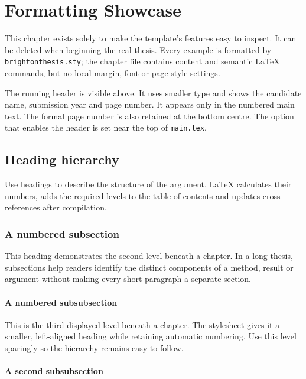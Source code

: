 \chapter{Formatting Showcase}
\label{chap:formatting-showcase}

This chapter exists solely to make the template's features easy to inspect.
It can be deleted when beginning the real thesis. Every example is formatted
by \texttt{brightonthesis.sty}; the chapter file contains content and semantic
LaTeX commands, but no local margin, font or page-style settings.

The running header is visible above. It uses smaller type and shows the
candidate name, submission year and page number. It appears only in the
numbered main text. The formal page number is also retained at the bottom
centre. The option that enables the header is set near the top of
\texttt{main.tex}.

\section{Heading hierarchy}
\label{sec:showcase-headings}

Use headings to describe the structure of the argument. LaTeX calculates their
numbers, adds the required levels to the table of contents and updates
cross-references after compilation.

\subsection{A numbered subsection}
\label{sec:showcase-subsection}

This heading demonstrates the second level beneath a chapter. In a long thesis,
subsections help readers identify the distinct components of a method, result
or argument without making every short paragraph a separate section.

\subsubsection{A numbered subsubsection}
\label{sec:showcase-subsubsection}

This is the third displayed level beneath a chapter. The stylesheet gives it a
smaller, left-aligned heading while retaining automatic numbering. Use this
level sparingly so the hierarchy remains easy to follow.

\subsubsection{A second subsubsection}


